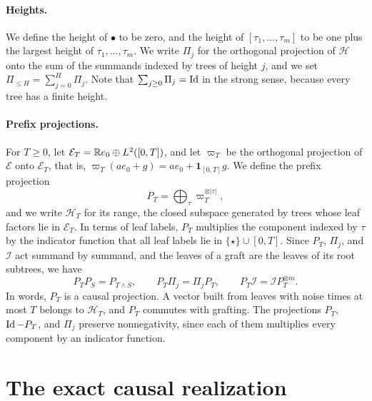 \paragraph{Heights.}
We define the height of $\bullet$ to be zero, and the height of $[\tau_1,\dots,\tau_m]$ to be one plus the largest height of $\tau_1,\dots,\tau_m$. We write $\Pi_j$ for the orthogonal projection of $\mathcal H$ onto the sum of the summands indexed by trees of height $j$, and we set $\Pi_{\le H}=\sum_{j=0}^H\Pi_j$. Note that $\sum_{j\ge0}\Pi_j=\operatorname{Id}$ in the strong sense, because every tree has a finite height.

\paragraph{Prefix projections.}
For $T\ge0$, let $\mathcal E_T=\mathbb R e_0\oplus L^2([0,T])$, and let $\varpi_T$ be the orthogonal projection of $\mathcal E$ onto $\mathcal E_T$, that is, $\varpi_T(ae_0+g)=ae_0+\mathbf 1_{[0,T]}g$. We define the prefix projection
\[
 P_T=\bigoplus_\tau\varpi_T^{\otimes|\tau|},
\]
and we write $\mathcal H_T$ for its range, the closed subspace generated by trees whose leaf factors lie in $\mathcal E_T$. In terms of leaf labels, $P_T$ multiplies the component indexed by $\tau$ by the indicator function that all leaf labels lie in $\{\star\}\cup[0,T]$. Since $P_T$, $\Pi_j$, and $\mathcal I$ act summand by summand, and the leaves of a graft are the leaves of its root subtrees, we have
\begin{equation}
 P_TP_S=P_{T\wedge S},\qquad P_T\Pi_j=\Pi_jP_T,\qquad
 P_T\mathcal I=\mathcal I P_T^{\otimes m}.
 \label{eq:geometry-prefix-commutation}
\end{equation}
In words, $P_T$ is a causal projection. A vector built from leaves with noise times at most $T$ belongs to $\mathcal H_T$, and $P_T$ commutes with grafting. The projections $P_T$, $\operatorname{Id}-P_T$, and $\Pi_j$ preserve nonnegativity, since each of them multiplies every component by an indicator function.

\section{The exact causal realization}\label{sec:tree-realization}

